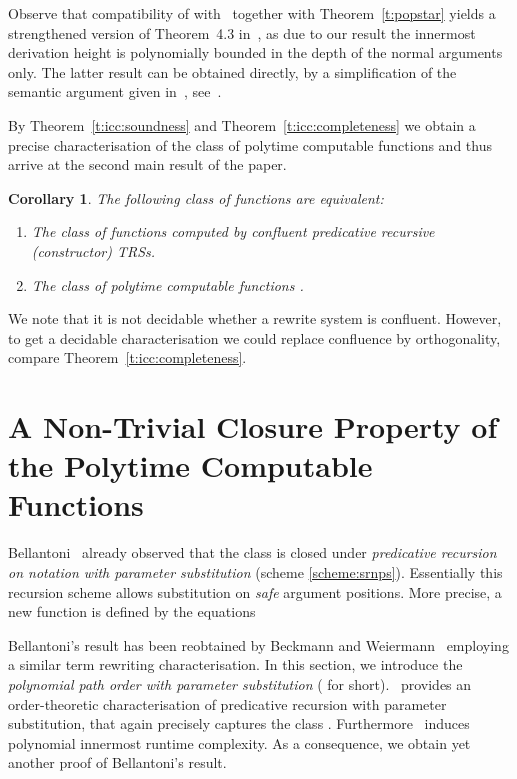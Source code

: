 \documentclass{LMCS}
\newtheorem{corollary}[thm]{Corollary}
\begin{document}
Observe that compatibility of  with \POPSTAR\ together with 
Theorem~\ref{t:popstar} yields a 
strengthened version of Theorem~4.3 in~\cite{BW96},
as due to our result the innermost derivation height is polynomially
bounded in the depth of the normal arguments only. The latter result can 
be obtained directly, by a simplification of 
the semantic argument given in~\cite[Section~4]{BW96}, see~\cite{AM04}.

By Theorem~\ref{t:icc:soundness} and Theorem~\ref{t:icc:completeness} we obtain a
precise characterisation of the class of polytime computable functions and
thus arrive at the second main result of the paper.

\begin{corollary}\label{c:FP}
  The following class of functions are equivalent:
  \begin{enumerate}[labelsep=*,leftmargin=*]
  \item The class of functions computed by confluent predicative recursive (constructor) TRSs.
  \item The class of polytime computable functions . 
  \end{enumerate}
\end{corollary}
We note that it is not decidable whether a rewrite system is confluent. However, 
to get a decidable characterisation we could replace confluence by orthogonality, compare 
Theorem~\ref{t:icc:completeness}.





\section{A Non-Trivial Closure Property of the Polytime Computable Functions}\label{s:popstarps}

Bellantoni~\cite{B:92} already observed that the class  is closed under
\emph{predicative recursion on notation with parameter substitution} (scheme \eqref{scheme:srnps}). 
Essentially this recursion scheme allows substitution on \emph{safe} argument positions. More precise, 
a new function  is defined by the equations


Bellantoni's result has been reobtained by Beckmann and 
Weiermann~\cite[Corollary~5.4]{BW96} employing a similar
term rewriting characterisation. In this section, we introduce
the \emph{polynomial path order with parameter substitution} (\emph{\POPSTARP} for short).
\POPSTARP\ provides an order-theoretic characterisation of
predicative recursion with parameter substitution, that again precisely
captures the class . Furthermore \POPSTARP\ induces polynomial
innermost runtime complexity. As a consequence, we obtain yet another proof
of Bellantoni's result.
\end{document}
